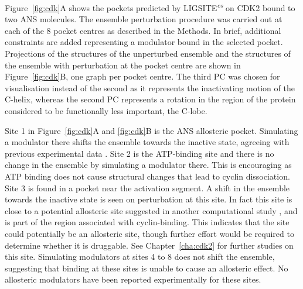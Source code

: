 Figure~\ref{fig:cdk}A shows the pockets predicted by LIGSITE\textsuperscript{\it cs} \cite{Huang2006} on CDK2 bound to two ANS molecules.
The ensemble perturbation procedure was carried out at each of the 8 pocket centres as described in the Methods.
In brief, additional constraints are added representing a modulator bound in the selected pocket.
Projections of the structures of the unperturbed ensemble and the structures of the ensemble with perturbation at the pocket centre are shown in Figure~\ref{fig:cdk}B, one graph per pocket centre.
The third PC was chosen for visualisation instead of the second as it represents the inactivating motion of the C-helix, whereas the second PC represents a rotation in the region of the protein considered to be functionally less important, the C-lobe.

Site 1 in Figure~\ref{fig:cdk}A and \ref{fig:cdk}B is the ANS allosteric pocket.
Simulating a modulator there shifts the ensemble towards the inactive state, agreeing with previous experimental data \cite{Betzi2011}.
Site 2 is the ATP-binding site and there is no change in the ensemble by simulating a modulator there.
This is encouraging as ATP binding does not cause structural changes that lead to cyclin dissociation.
Site 3 is found in a pocket near the activation segment.
A shift in the ensemble towards the inactive state is seen on perturbation at this site.
In fact this site is close to a potential allosteric site suggested in another computational study \cite{Pitt2014}, and is part of the region associated with cyclin-binding.
This indicates that the site could potentially be an allosteric site, though further effort would be required to determine whether it is druggable.
See Chapter~\ref{cha:cdk2} for further studies on this site.
Simulating modulators at sites 4 to 8 does not shift the ensemble, suggesting that binding at these sites is unable to cause an allosteric effect.
No allosteric modulators have been reported experimentally for these sites.


